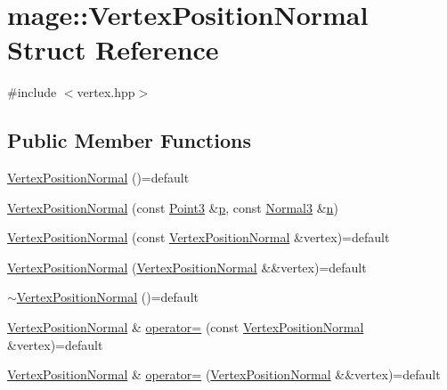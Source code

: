 \hypertarget{structmage_1_1_vertex_position_normal}{}\section{mage\+:\+:Vertex\+Position\+Normal Struct Reference}
\label{structmage_1_1_vertex_position_normal}


{\ttfamily \#include $<$vertex.\+hpp$>$}

\subsection*{Public Member Functions}
\begin{DoxyCompactItemize}
\item 
\hyperlink{structmage_1_1_vertex_position_normal_a470e35daf194befbf45ac3ecfd6848e3}{Vertex\+Position\+Normal} ()=default
\item 
\hyperlink{structmage_1_1_vertex_position_normal_ad2fc50a2050b9a7c961e1bd98d736710}{Vertex\+Position\+Normal} (const \hyperlink{structmage_1_1_point3}{Point3} \&\hyperlink{structmage_1_1_vertex_position_normal_ac95e9941363ec5687f0bf21e59b83940}{p}, const \hyperlink{structmage_1_1_normal3}{Normal3} \&\hyperlink{structmage_1_1_vertex_position_normal_a09baa618081e66e21cdfe5752dbf8df6}{n})
\item 
\hyperlink{structmage_1_1_vertex_position_normal_a9a0bb5edf57cc8b4e97b32a6eda1be93}{Vertex\+Position\+Normal} (const \hyperlink{structmage_1_1_vertex_position_normal}{Vertex\+Position\+Normal} \&vertex)=default
\item 
\hyperlink{structmage_1_1_vertex_position_normal_a23ca5ed9238a02837b44b97c5248dc12}{Vertex\+Position\+Normal} (\hyperlink{structmage_1_1_vertex_position_normal}{Vertex\+Position\+Normal} \&\&vertex)=default
\item 
\hyperlink{structmage_1_1_vertex_position_normal_a664123217b7e8d18769ea46fc318e0c1}{$\sim$\+Vertex\+Position\+Normal} ()=default
\item 
\hyperlink{structmage_1_1_vertex_position_normal}{Vertex\+Position\+Normal} \& \hyperlink{structmage_1_1_vertex_position_normal_a43c666c745b5807afddf87049ace0ef1}{operator=} (const \hyperlink{structmage_1_1_vertex_position_normal}{Vertex\+Position\+Normal} \&vertex)=default
\item 
\hyperlink{structmage_1_1_vertex_position_normal}{Vertex\+Position\+Normal} \& \hyperlink{structmage_1_1_vertex_position_normal_acd4c5c78fba38ea8ea61f8d508ce10a3}{operator=} (\hyperlink{structmage_1_1_vertex_position_normal}{Vertex\+Position\+Normal} \&\&vertex)=default
\end{DoxyCompactItemize}
